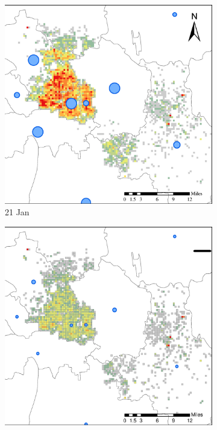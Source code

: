 \documentclass[preprints,ijgi,submit,moreauthors]{Definitions/mdpi}
\begin{document}
\begin{figure}[H]
    \centering
    \begin{subfigure}{.3\textwidth}
        \includegraphics[width=\textwidth]{Figures/Relation_with_confrimed_cases/NewDistrictSSBD2020_01_21.eps}
        \caption{21 Jan}
    \end{subfigure}
    \begin{subfigure}{.3\textwidth}
        \includegraphics[width=\textwidth]{Figures/Relation_with_confrimed_cases/NewDistrictSSBD2020_01_25.eps}

\end{subfigure}
\end{figure}
\end{document}
